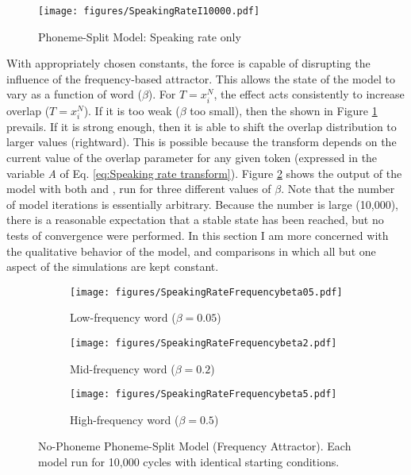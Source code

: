 \begin{figure}[h]
\texttt{[image: figures/SpeakingRateI10000.pdf]}\caption{\label{fig:SpeakingRateOnly}Phoneme-Split Model: Speaking rate only}
\end{figure}

With appropriately chosen constants, the  force is capable
of disrupting the influence of the frequency-based attractor. This
allows the  state of the model to vary as a function of
word  ($\beta$). For $T=x_{i}^{N}$, the  effect
acts consistently to increase  overlap ($T=x_{i}^{N}$). If
it is too weak ($\beta$ too small), then the  
shown in Figure \ref{fig:SpeakingRateOnly} prevails. If it is strong
enough, then it is able to shift the overlap distribution to larger
values (rightward). This is possible because the  transform
depends on the current value of the overlap parameter for any given
token (expressed in the variable \emph{A} of Eq. \ref{eq:Speaking rate transform}).
Figure \ref{fig:NasalizationModel1} shows the output of the model
with both  and  , run for three different
values of $\beta$. Note that the number of model iterations is essentially
arbitrary. Because the number is large (10,000), there is a reasonable
expectation that a stable state has been reached, but no tests of
convergence were performed. In this section I am more concerned
with the qualitative behavior of the model, and comparisons in which
all but one aspect of the simulations are kept constant.

\begin{figure}[h]
\begin{subfigure}[t]{.3\textwidth}
        \texttt{[image: figures/SpeakingRateFrequencybeta05.pdf]}
        \caption{Low-frequency word ($\beta=0.05$)}
    \end{subfigure}\hfill
    \begin{subfigure}[t]{.3\textwidth}
        \texttt{[image: figures/SpeakingRateFrequencybeta2.pdf]}
        \caption{Mid-frequency word ($\beta=0.2$)}
    \end{subfigure}\hfill
    \begin{subfigure}[t]{.3\textwidth}
        \texttt{[image: figures/SpeakingRateFrequencybeta5.pdf]}
        \caption{High-frequency word ($\beta=0.5$)}
    \end{subfigure}

\caption{\label{fig:NasalizationModel1}No-Phoneme Phoneme-Split Model (Frequency Attractor). Each model run for 10,000 cycles with identical starting conditions.}\end{figure}

